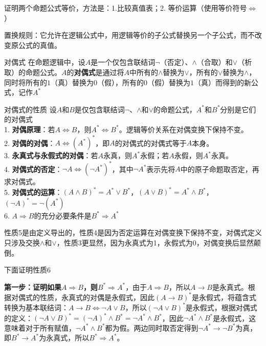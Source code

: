 证明两个命题公式等价，方法是：1.比较真值表；2. 等价运算（使用等价符号$\Leftrightarrow$）

置换规则：它允许在逻辑公式中，用逻辑等价的子公式替换另一个子公式，而不改变原公式的真值。
\begin{definition}{对偶式}{}
    在命题逻辑中，设$A$是一个仅包含联结词$\neg$（否定）、$\land$（合取）和$\lor$（析取）的命题公式。$A$的\textbf{对偶式}是通过将$A$中所有的$\land$替换为$\lor$，所有的$\lor$替换为$\land$，同时将所有的$1$（真）替换为$0$（假），所有的$0$（假）替换为$1$（真）而得到的新公式，记作$A^*$
\end{definition}
\begin{theorem}{对偶式的性质}{}
设$A$和$B$是仅包含联结词$\neg$、$\land$和$\lor$的命题公式，$A^*$和$B^*$分别是它们的对偶式\\
1. \textbf{对偶原理}：若$A \Leftrightarrow B$，则$A^* \Leftrightarrow B^*$。逻辑等价关系在对偶变换下保持不变。\\
2. \textbf{对偶的对偶}：$A \Leftrightarrow (A^*)^*$，即$A$的对偶式的对偶式等于$A$本身。\\
3. \textbf{永真式与永假式的对偶}：若$A$永真，则$A^*$永假；若$A$永假，则$A^*$永真。\\
4. \textbf{对偶式的否定}：$\neg A \Leftrightarrow (\neg A^*)^*$，其中$\neg A^*$表示先将$A$中的原子命题取否定，再求对偶式。\\
5. \textbf{对偶式的运算}：$(A \land B)^* = A^* \lor B^*$，$(A \lor B)^* = A^* \land B^*$，$(\neg A)^* = \neg (A^*)$\\
6. $A\Rightarrow B$的充分必要条件是$B^* \Rightarrow A^*$
\end{theorem}
性质5是由定义导出的，性质4是因为否定运算在对偶变换下保持不变，对偶式定义只涉及交换$\land$和$\lor$，性质3更显然，因为永真式为1，永假式为0，对偶变换后显然颠倒。

下面证明性质6

\textbf{第一步：证明如果$A \Rightarrow B$，则$B^* \Rightarrow A^*$}，由于$A \Rightarrow B$，所以$A \rightarrow B$是永真式。根据对偶式的性质，永真式的对偶是永假式，因此$(A \rightarrow B)^* $是永假式，将蕴含式转换为基本联结词：$A \rightarrow B \Leftrightarrow \neg A \lor B$，所以$(\neg A \lor B)^* \text{是永假式}$，根据对偶式的定义：$(\neg A \lor B)^* = (\neg A)^* \land B^* = \neg A^* \land B^*$，因此$\neg A^* \land B^*$是永假式，这意味着对于所有赋值，$\neg A^* \land B^*$都为假。两边同时取否定得到$\neg A^* \rightarrow \neg B^*$为真，即$B^* \rightarrow A^*$为永真式，所以$B^* \Rightarrow A^*$。

